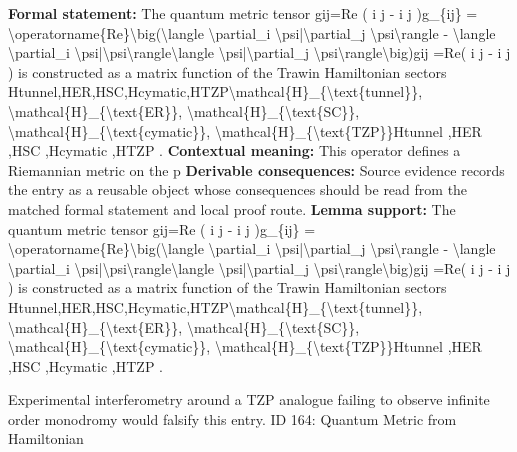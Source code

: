 \begingroup\footnotesize\setlength{\emergencystretch}{3em}\sloppy
\textbf{Formal statement:} The quantum metric tensor gij=Re (  i   j  -  i        j  )g\_\{ij\} = \textbackslash{}operatorname\{Re\}\textbackslash{}big(\textbackslash{}langle \textbackslash{}partial\_i \textbackslash{}psi|\textbackslash{}partial\_j \textbackslash{}psi\textbackslash{}rangle - \textbackslash{}langle \textbackslash{}partial\_i \textbackslash{}psi|\textbackslash{}psi\textbackslash{}rangle\textbackslash{}langle \textbackslash{}psi|\textbackslash{}partial\_j \textbackslash{}psi\textbackslash{}rangle\textbackslash{}big)gij =Re(  i    j   -  i         j   ) is constructed as a matrix function of the Trawin Hamiltonian sectors Htunnel,HER,HSC,Hcymatic,HTZP\textbackslash{}mathcal\{H\}\_\{\textbackslash{}text\{tunnel\}\}, \textbackslash{}mathcal\{H\}\_\{\textbackslash{}text\{ER\}\}, \textbackslash{}mathcal\{H\}\_\{\textbackslash{}text\{SC\}\}, \textbackslash{}mathcal\{H\}\_\{\textbackslash{}text\{cymatic\}\}, \textbackslash{}mathcal\{H\}\_\{\textbackslash{}text\{TZP\}\}Htunnel ,HER ,HSC ,Hcymatic ,HTZP .
\textbf{Contextual meaning:} This operator defines a Riemannian metric on the p
\textbf{Derivable consequences:} Source evidence records the entry as a reusable object whose consequences should be read from the matched formal statement and local proof route.
\textbf{Lemma support:} The quantum metric tensor gij=Re (  i   j  -  i        j  )g\_\{ij\} = \textbackslash{}operatorname\{Re\}\textbackslash{}big(\textbackslash{}langle \textbackslash{}partial\_i \textbackslash{}psi|\textbackslash{}partial\_j \textbackslash{}psi\textbackslash{}rangle - \textbackslash{}langle \textbackslash{}partial\_i \textbackslash{}psi|\textbackslash{}psi\textbackslash{}rangle\textbackslash{}langle \textbackslash{}psi|\textbackslash{}partial\_j \textbackslash{}psi\textbackslash{}rangle\textbackslash{}big)gij =Re(  i    j   -  i         j   ) is constructed as a matrix function of the Trawin Hamiltonian sectors Htunnel,HER,HSC,Hcymatic,HTZP\textbackslash{}mathcal\{H\}\_\{\textbackslash{}text\{tunnel\}\}, \textbackslash{}mathcal\{H\}\_\{\textbackslash{}text\{ER\}\}, \textbackslash{}mathcal\{H\}\_\{\textbackslash{}text\{SC\}\}, \textbackslash{}mathcal\{H\}\_\{\textbackslash{}text\{cymatic\}\}, \textbackslash{}mathcal\{H\}\_\{\textbackslash{}text\{TZP\}\}Htunnel ,HER ,HSC ,Hcymatic ,HTZP .\par
\endgroup

Experimental interferometry around a TZP analogue failing to observe infinite order monodromy would falsify this entry. ID 164: Quantum Metric from Hamiltonian

